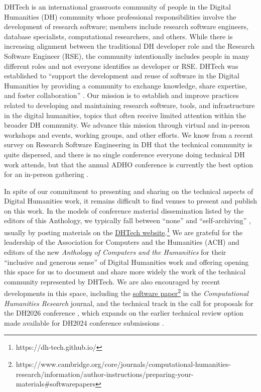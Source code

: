 \documentclass[final]{anthology-ch} %
\begin{document}
DHTech is an international grassroots community of people in the Digital Humanities (DH) community whose professional responsibilities involve the development of research software; members include research software engineers, database specialists, computational  researchers, and others.  While there is increasing alignment between the traditional DH developer role and the Research Software Engineer (RSE),  the community intentionally includes people in many different roles and not everyone identifies as developer or RSE. DHTech was established to ``support the development and reuse of software in the Digital Humanities by providing a community to exchange knowledge, share expertise, and foster collaboration'' \cite{noauthor_about_nodate}.   Our mission is to establish and improve practices related to developing and maintaining research software, tools, and infrastructure in the digital humanities, topics that often receive limited attention within the broader DH community. We advance this mission through virtual and in-person workshops and events, working groups, and other efforts. We know from a recent survey on Research Software Engineering in DH that the technical community is quite dispersed, and there is no single conference everyone doing technical DH work attends, but that the annual ADHO conference is currently the best option for an in-person gathering  \cite{damerow_surveying_2025}.

In spite of our commitment to presenting and sharing on the technical aspects of Digital Humanities work, it remains difficult to find venues to present and publish on this work. In the models of conference material dissemination listed by the editors of this Anthology, we typically fall between ``none'' and ``self-archiving''  \cite{10.63744@rWDzgqfDLYNm},  usually by posting materials on the \href{https://dh-tech.github.io/}{DHTech website}.\footnote{https://dh-tech.github.io/} We are grateful for the leadership of the Association for Computers and the Humanities (ACH) and editors of the new \textit{Anthology of Computers and the Humanities} for their ``inclusive and generous sense'' of Digital Humanities work \cite{10.63744@rWDzgqfDLYNm} and offering opening this space for us to document and share more widely the work of the technical community represented by DHTech.  We are also encouraged by recent developments in this space, including the \href{https://www.cambridge.org/core/journals/computational-humanities-research/information/author-instructions/preparing-your-materials#softwarepapers}{software paper}\footnote{https://www.cambridge.org/core/journals/computational-humanities-research/information/author-instructions/preparing-your-materials\#softwarepapers } in the \textit{Computational Humanities Research} journal, and the technical track in the call for proposals for the DH2026 conference \cite{noauthor_cfp_nodate}, which expands on the earlier technical review option made available for DH2024 conference submissions \cite{noauthor_call_nodate}.
\end{document}
